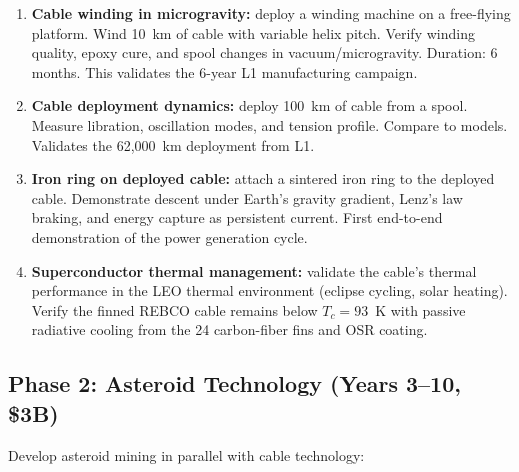 \documentclass[12pt,letterpaper]{article}
\begin{document}
\begin{enumerate}[label=(\roman*)]
\item \textbf{Cable winding in microgravity:} deploy a winding machine on a free-flying platform. Wind 10~km of cable with variable helix pitch. Verify winding quality, epoxy cure, and spool changes in vacuum/microgravity. Duration: 6 months. This validates the 6-year L1 manufacturing campaign.

\item \textbf{Cable deployment dynamics:} deploy 100~km of cable from a spool. Measure libration, oscillation modes, and tension profile. Compare to models. Validates the 62,000~km deployment from L1.

\item \textbf{Iron ring on deployed cable:} attach a sintered iron ring to the deployed cable. Demonstrate descent under Earth's gravity gradient, Lenz's law braking, and energy capture as persistent current. First end-to-end demonstration of the power generation cycle.

\item \textbf{Superconductor thermal management:} validate the cable's thermal performance in the LEO thermal environment (eclipse cycling, solar heating). Verify the finned REBCO cable remains below $T_c = 93$~K with passive radiative cooling from the 24 carbon-fiber fins and OSR coating.
\end{enumerate}

\subsection{Phase 2: Asteroid Technology (Years 3--10, \$3B)}

Develop asteroid mining in parallel with cable technology:
\end{document}
